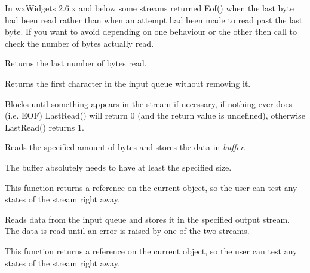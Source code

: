 
In wxWidgets 2.6.x and below some streams returned Eof() when the last
byte had been read rather than when an attempt had been made to read
past the last byte. If you want to avoid depending on one behaviour or
the other then call  to
check the number of bytes actually read.

\label{wxinputstreamlastread}


Returns the last number of bytes read.

\label{wxinputstreampeek}


Returns the first character in the input queue without removing it.


Blocks until something appears in the stream if necessary, if nothing
ever does (i.e. EOF) LastRead() will return 0 (and the return value is
undefined), otherwise LastRead() returns 1.

\label{wxinputstreamread}


Reads the specified amount of bytes and stores the data in {\it buffer}.


The buffer absolutely needs to have at least the specified size.


This function returns a reference on the current object, so the user can test
any states of the stream right away.


Reads data from the input queue and stores it in the specified output stream.
The data is read until an error is raised by one of the two streams.


This function returns a reference on the current object, so the user can test
any states of the stream right away.

\label{wxinputstreamseeki}


